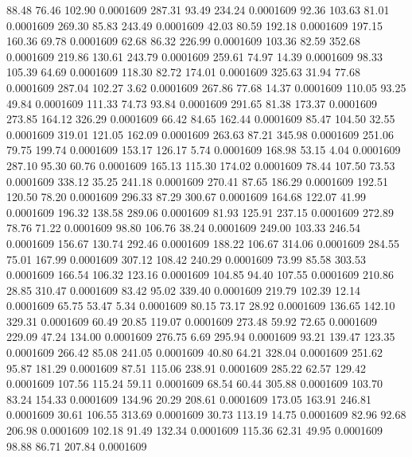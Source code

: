   88.48   76.46  102.90   0.0001609
 287.31   93.49  234.24   0.0001609
  92.36  103.63   81.01   0.0001609
 269.30   85.83  243.49   0.0001609
  42.03   80.59  192.18   0.0001609
 197.15  160.36   69.78   0.0001609
  62.68   86.32  226.99   0.0001609
 103.36   82.59  352.68   0.0001609
 219.86  130.61  243.79   0.0001609
 259.61   74.97   14.39   0.0001609
  98.33  105.39   64.69   0.0001609
 118.30   82.72  174.01   0.0001609
 325.63   31.94   77.68   0.0001609
 287.04  102.27    3.62   0.0001609
 267.86   77.68   14.37   0.0001609
 110.05   93.25   49.84   0.0001609
 111.33   74.73   93.84   0.0001609
 291.65   81.38  173.37   0.0001609
 273.85  164.12  326.29   0.0001609
  66.42   84.65  162.44   0.0001609
  85.47  104.50   32.55   0.0001609
 319.01  121.05  162.09   0.0001609
 263.63   87.21  345.98   0.0001609
 251.06   79.75  199.74   0.0001609
 153.17  126.17    5.74   0.0001609
 168.98   53.15    4.04   0.0001609
 287.10   95.30   60.76   0.0001609
 165.13  115.30  174.02   0.0001609
  78.44  107.50   73.53   0.0001609
 338.12   35.25  241.18   0.0001609
 270.41   87.65  186.29   0.0001609
 192.51  120.50   78.20   0.0001609
 296.33   87.29  300.67   0.0001609
 164.68  122.07   41.99   0.0001609
 196.32  138.58  289.06   0.0001609
  81.93  125.91  237.15   0.0001609
 272.89   78.76   71.22   0.0001609
  98.80  106.76   38.24   0.0001609
 249.00  103.33  246.54   0.0001609
 156.67  130.74  292.46   0.0001609
 188.22  106.67  314.06   0.0001609
 284.55   75.01  167.99   0.0001609
 307.12  108.42  240.29   0.0001609
  73.99   85.58  303.53   0.0001609
 166.54  106.32  123.16   0.0001609
 104.85   94.40  107.55   0.0001609
 210.86   28.85  310.47   0.0001609
  83.42   95.02  339.40   0.0001609
 219.79  102.39   12.14   0.0001609
  65.75   53.47    5.34   0.0001609
  80.15   73.17   28.92   0.0001609
 136.65  142.10  329.31   0.0001609
  60.49   20.85  119.07   0.0001609
 273.48   59.92   72.65   0.0001609
 229.09   47.24  134.00   0.0001609
 276.75    6.69  295.94   0.0001609
  93.21  139.47  123.35   0.0001609
 266.42   85.08  241.05   0.0001609
  40.80   64.21  328.04   0.0001609
 251.62   95.87  181.29   0.0001609
  87.51  115.06  238.91   0.0001609
 285.22   62.57  129.42   0.0001609
 107.56  115.24   59.11   0.0001609
  68.54   60.44  305.88   0.0001609
 103.70   83.24  154.33   0.0001609
 134.96   20.29  208.61   0.0001609
 173.05  163.91  246.81   0.0001609
  30.61  106.55  313.69   0.0001609
  30.73  113.19   14.75   0.0001609
  82.96   92.68  206.98   0.0001609
 102.18   91.49  132.34   0.0001609
 115.36   62.31   49.95   0.0001609
  98.88   86.71  207.84   0.0001609
